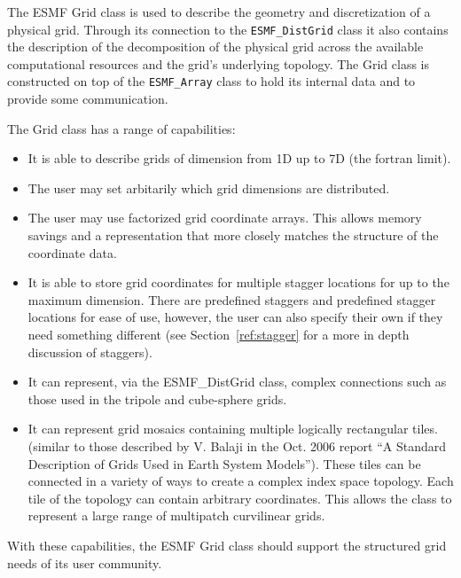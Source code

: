 %



The ESMF Grid class is used to describe the geometry and discretization
of a physical grid.  Through its connection to the {\tt ESMF\_DistGrid}
class it also contains the description of the decomposition of the 
physical grid across the available computational resources and the grid's underlying
topology. The Grid class is constructed on top of the 
{\tt ESMF\_Array} class to hold its internal data and to provide
some communication. 

\medskip

The Grid class has a range of capabilities:
\begin{itemize}

\item It is able to describe grids of dimension from 1D up to 7D (the fortran limit).

\item The user may set arbitarily which grid dimensions are distributed. 

\item The user may use factorized grid coordinate arrays. This allows
      memory savings and a representation that more closely matches 
      the structure of the  coordinate data. 

\item  It is able to store grid coordinates for multiple stagger locations for up to the maximum dimension. There are predefined staggers and predefined stagger locations for ease of use, however, the user can also specify their own if they need something different (see Section~\ref{ref:stagger} for a more in depth discussion of staggers).

\item It can represent, via the ESMF\_DistGrid class, complex connections such 
      as those used in the tripole and cube-sphere grids. 

\item It can represent grid mosaics containing multiple logically rectangular
tiles. (similar to those described by V. Balaji in the Oct. 2006 report ``A Standard Description of Grids Used in Earth System Models''). These tiles can be connected in a variety of ways to create a complex index space topology. Each tile of the topology can contain arbitrary coordinates. This allows the class to represent a large range of multipatch curvilinear grids. 

\end{itemize}

\medskip

 With these capabilities, the ESMF Grid class should support the structured grid needs of its user community. 
